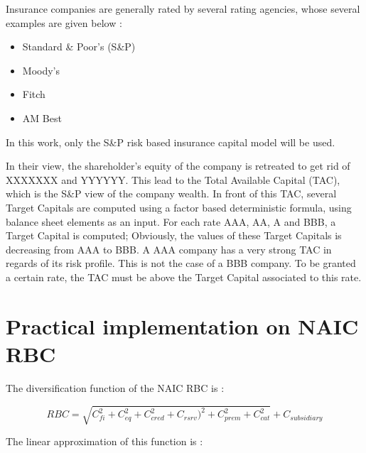 Insurance companies are generally rated by several rating agencies, whose several examples are given below :

\begin{itemize}
\itemsep0em 
\item Standard \& Poor's (S\&P)
\item Moody's
\item Fitch
\item AM Best
\end{itemize}

In this work, only the S\&P risk based insurance capital model will be used.

In their view, the shareholder's equity of the company is retreated to get rid of XXXXXXX and YYYYYY. This lead to the Total Available Capital (TAC), which is the S\&P view of the company wealth. In front of this TAC, several Target Capitals are computed using a factor based deterministic formula, using balance sheet elements as an input. For each rate AAA, AA, A and BBB, a Target Capital is computed; Obviously, the values of these Target Capitals is decreasing from AAA to BBB. A AAA company has a very strong TAC in regards of its risk profile. This is not the case of a BBB company. To be granted a certain rate, the TAC must be above the Target Capital associated to this rate.





\section{Practical implementation on NAIC RBC}


The diversification function of the NAIC RBC is :

\begin{equation}
	RBC = \sqrt{C_{fi}^2 + C_{eq}^2 + C_{cred}^2 + C_{rsrv} )^2 + C_{prem}^2 + C_{cat}^2} + C_{subsidiary}
\end{equation}


The linear approximation of this function is :


